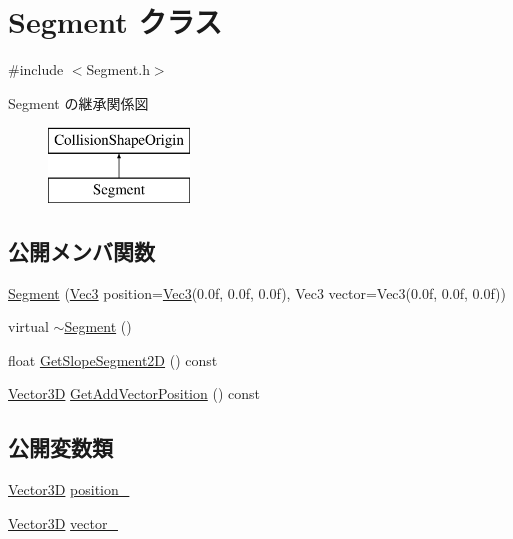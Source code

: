 \hypertarget{class_segment}{}\section{Segment クラス}
\label{class_segment}


{\ttfamily \#include $<$Segment.\+h$>$}

Segment の継承関係図\begin{figure}[H]
\begin{center}
\leavevmode
\includegraphics[height=2.000000cm]{class_segment}
\end{center}
\end{figure}
\subsection*{公開メンバ関数}
\begin{DoxyCompactItemize}
\item 
\mbox{\hyperlink{class_segment_af491ed36fc8467aaaf503ba1053b85fd}{Segment}} (\mbox{\hyperlink{_vector3_d_8h_ab16f59e4393f29a01ec8b9bbbabbe65d}{Vec3}} position=\mbox{\hyperlink{_vector3_d_8h_ab16f59e4393f29a01ec8b9bbbabbe65d}{Vec3}}(0.\+0f, 0.\+0f, 0.\+0f), Vec3 vector=\+Vec3(0.\+0f, 0.\+0f, 0.\+0f))
\item 
virtual \mbox{\hyperlink{class_segment_a76b45a453304f1f485e3bc2fcad58b59}{$\sim$\+Segment}} ()
\item 
float \mbox{\hyperlink{class_segment_a889d62f6d4c10701464726da706ae043}{Get\+Slope\+Segment2D}} () const
\item 
\mbox{\hyperlink{class_vector3_d}{Vector3D}} \mbox{\hyperlink{class_segment_a4223e990a42cc9e487ef51b82e63e777}{Get\+Add\+Vector\+Position}} () const
\end{DoxyCompactItemize}
\subsection*{公開変数類}
\begin{DoxyCompactItemize}
\item 
\mbox{\hyperlink{class_vector3_d}{Vector3D}} \mbox{\hyperlink{class_segment_aee447b161d940d22e9aa222091789e08}{position\+\_\+}}
\item 
\mbox{\hyperlink{class_vector3_d}{Vector3D}} \mbox{\hyperlink{class_segment_a6834b88ecae688f0fc5b4ed95fab824b}{vector\+\_\+}}
\end{DoxyCompactItemize}
